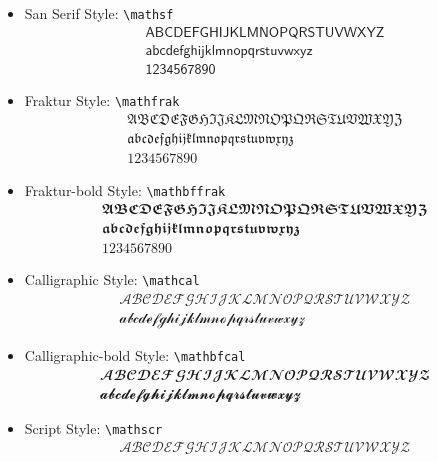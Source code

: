 \documentclass[
	12pt, 
	]{article}
\numberwithin{equation}{section}
\newcommand{\com}[1]{\texttt{\textbackslash #1}}
\theoremstyle{definition}
\theoremstyle{plain}
\theoremstyle{plain}
\theoremstyle{plain}
\begin{document}
\begin{itemize}
	
	\item San Serif Style: \com{mathsf}
	\begin{gather*}
		\mathsf{
			A B C D E F G H I J K L M N O P Q R S T U V W X Y Z
		}\\
		\mathsf{
			a b c d e f g h i j k l m n o p q r s t u v w x y z
		}\\
		\mathsf{
			1 2 3 4 5 6 7 8 9 0
		}
	\end{gather*}
	
	\item Fraktur Style: \com{mathfrak}
	\begin{gather*}
		\mathfrak{
			A B C D E F G H I J K L M N O P Q R S T U V W X Y Z
		}\\
		\mathfrak{
			a b c d e f g h i j k l m n o p q r s t u v w x y z
		}\\
		\mathfrak{
			1 2 3 4 5 6 7 8 9 0
		}
	\end{gather*}
	
	\item Fraktur-bold Style: \com{mathbffrak}
	\begin{gather*}
		\mathbffrak{
			A B C D E F G H I J K L M N O P Q R S T U V W X Y Z
		}\\
		\mathbffrak{
			a b c d e f g h i j k l m n o p q r s t u v w x y z
		}\\
		\mathbffrak{
			1 2 3 4 5 6 7 8 9 0
		}
	\end{gather*}
	
	\item Calligraphic Style: \com{mathcal}
	\begin{gather*}
		\mathcal{
			A B C D E F G H I J K L M N O P Q R S T U V W X Y Z
		}\\
		\mathcal{
			a b c d e f g h i j k l m n o p q r s t u v w x y z
		}
	\end{gather*}
	
	\item Calligraphic-bold Style: \com{mathbfcal}
	\begin{gather*}
		\mathbfcal{
			A B C D E F G H I J K L M N O P Q R S T U V W X Y Z
		}\\
		\mathbfcal{
			a b c d e f g h i j k l m n o p q r s t u v w x y z
		}
	\end{gather*}
	
	\item Script Style: \com{mathscr}
	\begin{gather*}
		\mathscr{
			A B C D E F G H I J K L M N O P Q R S T U V W X Y Z
		}
	\end{gather*}
	

\end{itemize}
\end{document}
